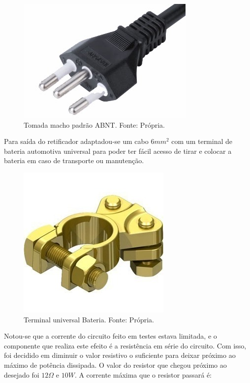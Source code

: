         \begin{figure}[!htb]
            \centering
            \includegraphics[scale= 0.4]{figuras/Pardrao_tomada.jpg}
            \caption{Tomada macho padrão ABNT. Fonte: Própria.}
            \label{tomada}
        \end{figure}	 
        
        Para saída do retificador adaptadou-se um cabo $6mm^2$ com um terminal de 						bateria automotiva universal para poder ter fácil acesso de tirar e 							colocar a bateria em caso de transporte ou manutenção.  
        
        \begin{figure}[!htb]
            \centering
            \includegraphics[scale= 0.4]{figuras/Terminal_Bateria.jpg}
            \caption{Terminal universal Bateria. Fonte: Própria.}
            \label{terminal}
        \end{figure}

        Notou-se que a corrente do circuito feito em testes estava limitada, e o 						componente que realiza este efeito é a resistência em série do circuito. Com 					isso, foi decidido em diminuir o valor resistivo o suficiente para deixar 						próximo ao máximo de potência dissipada. O valor do resistor que chegou 						próximo ao desejado foi $12\Omega$ e $10W$. A corrente máxima que o resistor 					passará é:
        
